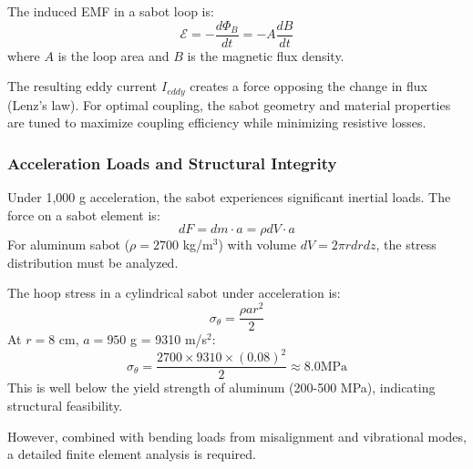 The induced EMF in a sabot loop is:
\begin{equation}
\mathcal{E} = -\frac{d\Phi_B}{dt} = -A \frac{dB}{dt}
\end{equation}
where $A$ is the loop area and $B$ is the magnetic flux density.

The resulting eddy current $I_{eddy}$ creates a force opposing the change in flux (Lenz's law). For optimal coupling, the sabot geometry and material properties are tuned to maximize coupling efficiency while minimizing resistive losses.

\subsubsection{Acceleration Loads and Structural Integrity}
Under 1,000 g acceleration, the sabot experiences significant inertial loads. The force on a sabot element is:
\begin{equation}
dF = dm \cdot a = \rho  dV \cdot a
\end{equation}
For aluminum sabot ($\rho = 2700$ kg/m$^3$) with volume $dV = 2\pi r  dr  dz$, the stress distribution must be analyzed.

The hoop stress in a cylindrical sabot under acceleration is:
\begin{equation}
\sigma_{\theta} = \frac{\rho a r^2}{2}
\end{equation}
At $r = 8$ cm, $a = 950$ g = 9310 m/s$^2$:
\begin{equation}
\sigma_{\theta} = \frac{2700 \times 9310 \times (0.08)^2}{2} \approx 8.0  \text{MPa}
\end{equation}
This is well below the yield strength of aluminum (200-500 MPa), indicating structural feasibility.

However, combined with bending loads from misalignment and vibrational modes, a detailed finite element analysis is required.

